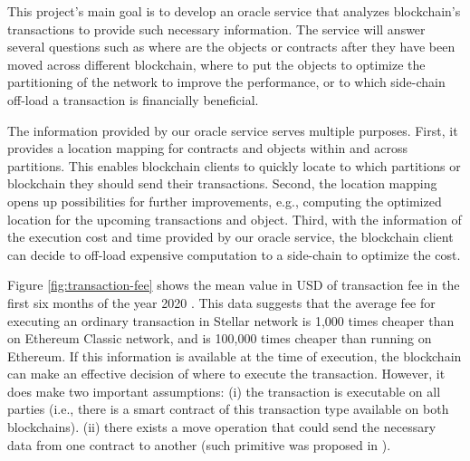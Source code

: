 This project's main goal is to develop an oracle service that analyzes
blockchain's transactions to provide such necessary information. The service
will answer several questions such as where are the objects or contracts
after they have been moved across different blockchain, where to put the objects
to optimize the partitioning of the network to improve the performance, or to
which side-chain off-load a transaction is financially beneficial.

The information provided by our oracle service serves multiple purposes. First,
it provides a location mapping for contracts and objects within and across
partitions. This enables blockchain clients to quickly locate to which
partitions or blockchain they should send their transactions. Second, the
location mapping opens up possibilities for further improvements, e.g.,
computing the optimized location for the upcoming transactions and object.
Third, with the information of the execution cost and time provided by our
oracle service, the blockchain client can decide to off-load expensive
computation to a side-chain to optimize the cost.



Figure \ref{fig:transaction-fee} shows the mean value in USD of transaction
fee in the first six months of the year 2020 \cite{transactionfee}. This data
suggests that the average fee for executing an ordinary transaction in Stellar
network is 1,000 times cheaper than on Ethereum Classic network, and is 100,000
times cheaper than running on Ethereum. If this information is available at the
time of execution, the blockchain can make an effective decision of where to
execute the transaction. However, it does make two important assumptions: (i)
the transaction is executable on all parties (i.e., there is a smart contract of
this transaction type available on both blockchains). (ii) there exists a move
operation that could send the necessary data from one contract to another (such
primitive was proposed in \cite{fynn2020move}).

